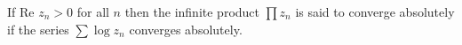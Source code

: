If $\text{Re } z_n > 0$ for all $n$ then the infinite product $\prod z_n$ is said to converge absolutely if the series $\sum \log z_n$ converges absolutely.
